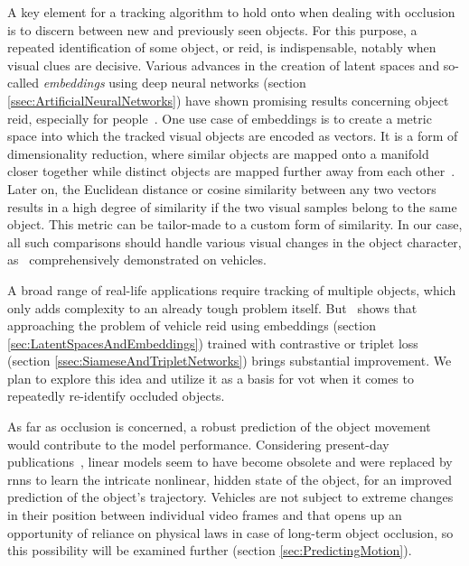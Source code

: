 A key element for a tracking algorithm to hold onto when dealing with occlusion is to discern between new and previously seen objects. For this purpose, a repeated identification of some object, or \gls{reid}, is indispensable, notably when visual clues are decisive. Various advances in the creation of latent spaces and so-called \emph{embeddings} using deep neural networks (section \ref{ssec:ArtificialNeuralNetworks}) have shown promising results concerning object \gls{reid}, especially for people~\cite{schroff2015facenet, taigman2014deepface}. One use case of embeddings is to create a metric space into which the tracked visual objects are encoded as vectors. It is a form of dimensionality reduction, where similar objects are mapped onto a manifold closer together while distinct objects are mapped further away from each other~\cite{hadsell2006dimreduction}. Later on, the Euclidean distance or cosine similarity between any two vectors results in a high degree of similarity if the two visual samples belong to the same object. This metric can be tailor-made to a custom form of similarity. In our case, all such comparisons should handle various visual changes in the object character, as~\cite{kuma2019vehiclereid} comprehensively demonstrated on vehicles.

A broad range of real-life applications require tracking of multiple objects, which only adds complexity to an already tough problem itself. But~\cite{kuma2019vehiclereid} shows that approaching the problem of vehicle \gls{reid} using embeddings (section \ref{sec:LatentSpacesAndEmbeddings}) trained with contrastive or triplet loss (section \ref{ssec:SiameseAndTripletNetworks}) brings substantial improvement. We plan to explore this idea and utilize it as a basis for \gls{vot} when it comes to repeatedly re-identify occluded objects.

As far as occlusion is concerned, a robust prediction of the object movement would contribute to the model performance. Considering present-day publications~\cite{tan2019motyolo}, linear models seem to have become obsolete and were replaced by \glspl{rnn} to learn the intricate nonlinear, hidden state of the object, for an improved prediction of the object’s trajectory. Vehicles are not subject to extreme changes in their position between individual video frames and that opens up an opportunity of reliance on physical laws in case of long-term object occlusion, so this possibility will be examined further (section \ref{sec:PredictingMotion}).

